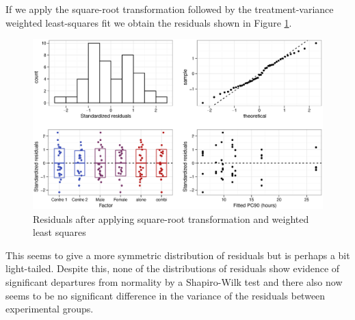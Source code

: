 If we apply the square-root transformation followed by the treatment-variance weighted least-squares fit we obtain the residuals shown in Figure \ref{aovsqrtresw}.
\begin{figure}[p]
\includegraphics[width=150mm]{aovsqrtresw.eps} 
\caption{Residuals after applying square-root transformation and weighted least squares}
\label{aovsqrtresw}
\end{figure}
This seems to give a more symmetric distribution of residuals but is perhaps a bit light-tailed.
Despite this, none of the distributions of residuals show evidence of significant departures from normality by a Shapiro-Wilk test and there also now seems to be no significant difference in the variance of the residuals between experimental groups.

